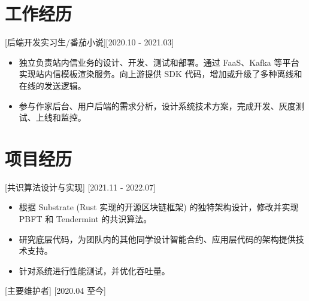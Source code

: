 \documentclass{resume}
\begin{document}
\section{工作经历}

[后端开发实习生/番茄小说][2020.10 - 2021.03] 
\begin{itemize}
  \item 独立负责站内信业务的设计、开发、测试和部署。通过 FaaS、Kafka 等平台实现站内信模板渲染服务。向上游提供 SDK 代码，增加或升级了多种离线和在线的发送逻辑。
  \item 参与作家后台、用户后端的需求分析，设计系统技术方案，完成开发、灰度测试、上线和监控。
\end{itemize}


%
%
%
%

\section{项目经历}

[共识算法设计与实现]
[2021.11 - 2022.07] 

\begin{itemize}
  \item 根据 Substrate (Rust 实现的开源区块链框架) 的独特架构设计，修改并实现 PBFT 和 Tendermint 的共识算法。
  \item 研究底层代码，为团队内的其他同学设计智能合约、应用层代码的架构提供技术支持。
  \item 针对系统进行性能测试，并优化吞吐量。 
\end{itemize}

[主要维护者]
[2020.04 至今]
\end{document}

